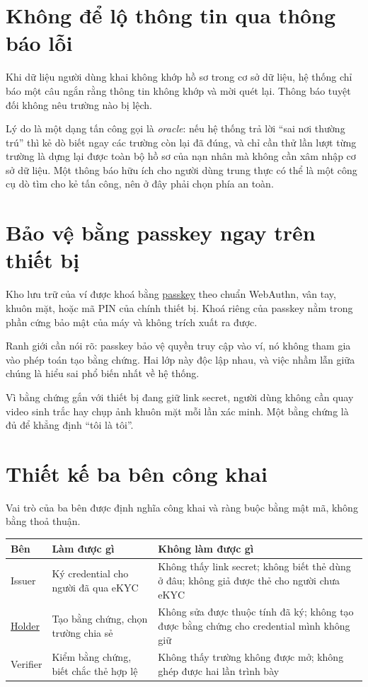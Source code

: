 \documentclass[a4paper,11pt,oneside]{report}
\theoremstyle{definition}
\theoremstyle{plain}
\newcommand{\g}[2]{\hyperref[term:#1]{#2}}
\begin{document}
\section{Không để lộ thông tin qua thông báo lỗi}

Khi dữ liệu người dùng khai không khớp hồ sơ trong cơ sở dữ liệu, hệ thống chỉ báo một câu ngắn
rằng thông tin không khớp và mời quét lại. Thông báo tuyệt đối không nêu trường nào bị lệch.

Lý do là một dạng tấn công gọi là \emph{oracle}: nếu hệ thống trả lời ``sai nơi thường trú'' thì
kẻ dò biết ngay các trường còn lại đã đúng, và chỉ cần thử lần lượt từng trường là dựng lại được
toàn bộ hồ sơ của nạn nhân mà không cần xâm nhập cơ sở dữ liệu. Một thông báo hữu ích cho người
dùng trung thực có thể là một công cụ dò tìm cho kẻ tấn công, nên ở đây phải chọn phía an toàn.

\section{Bảo vệ bằng passkey ngay trên thiết bị}

Kho lưu trữ của ví được khoá bằng \g{passkey}{passkey} theo chuẩn WebAuthn, vân tay, khuôn
mặt, hoặc mã PIN của chính thiết bị. Khoá riêng của passkey nằm trong phần cứng bảo mật của máy
và không trích xuất ra được.

Ranh giới cần nói rõ: passkey bảo vệ quyền truy cập vào ví, nó không tham gia vào phép toán tạo
bằng chứng. Hai lớp này độc lập nhau, và việc nhầm lẫn giữa chúng là hiểu sai phổ biến nhất về hệ
thống.

Vì bằng chứng gắn với thiết bị đang giữ link secret, người dùng không cần quay
video sinh trắc hay chụp ảnh khuôn mặt mỗi lần xác minh. Một bằng chứng là đủ để khẳng định ``tôi
là tôi''.

\section{Thiết kế ba bên công khai}

Vai trò của ba bên được định nghĩa công khai và ràng buộc bằng mật mã, không bằng thoả thuận.

\begin{center}
\begin{tabular}{@{}p{2.6cm}p{5.2cm}p{6.4cm}@{}}
\toprule
\textbf{\sffamily Bên} & \textbf{\sffamily Làm được gì} & \textbf{\sffamily Không làm được gì} \\
\midrule
Issuer &
Ký credential cho người đã qua eKYC &
Không thấy link secret; không biết thẻ dùng ở đâu; không giả được thẻ cho người
chưa eKYC \\
\addlinespace
\g{holder}{Holder} &
Tạo bằng chứng, chọn trường chia sẻ &
Không sửa được thuộc tính đã ký; không tạo được bằng chứng cho credential mình không giữ \\
\addlinespace
Verifier &
Kiểm bằng chứng, biết chắc thẻ hợp lệ &
Không thấy trường không được mở; không ghép được hai lần trình bày \\
\bottomrule
\end{tabular}
\end{center}
\end{document}
